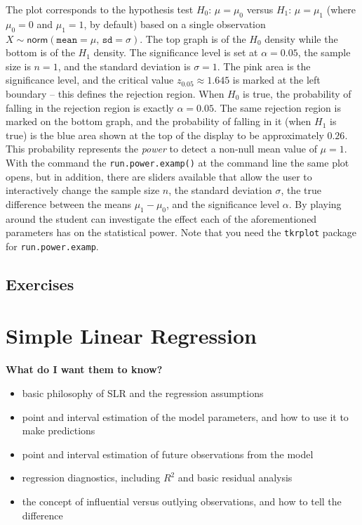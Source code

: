 \documentclass[]{book}
\providecommand{\tightlist}{%
  \setlength{\itemsep}{0pt}\setlength{\parskip}{0pt}}
\numberwithin{equation}{chapter}
\numberwithin{figure}{chapter}
\theoremstyle{plain}
\theoremstyle{definition}
\theoremstyle{remark}
\theoremstyle{definition}
\theoremstyle{definition}
\theoremstyle{remark}
\begin{document}
The plot corresponds to the hypothesis test \(H_{0}:\,\mu=\mu_{0}\)
versus \(H_{1}:\,\mu=\mu_{1}\) (where \(\mu_{0}=0\) and \(\mu_{1}=1\),
by default) based on a single observation
\(X\sim\mathsf{norm}(\mathtt{mean}=\mu,\,\mathtt{sd}=\sigma)\). The top
graph is of the \(H_{0}\) density while the bottom is of the \(H_{1}\)
density. The significance level is set at \(\alpha=0.05\), the sample
size is \(n=1\), and the standard deviation is \(\sigma=1\). The pink
area is the significance level, and the critical value
\(z_{0.05}\approx1.645\) is marked at the left boundary -- this defines
the rejection region. When \(H_{0}\) is true, the probability of falling
in the rejection region is exactly \(\alpha=0.05\). The same rejection
region is marked on the bottom graph, and the probability of falling in
it (when \(H_{1}\) is true) is the blue area shown at the top of the
display to be approximately \(0.26\). This probability represents the
\emph{power} to detect a non-null mean value of \(\mu=1\). With the
command the \texttt{run.power.examp()} at the command line the same plot
opens, but in addition, there are sliders available that allow the user
to interactively change the sample size \(n\), the standard deviation
\(\sigma\), the true difference between the means \(\mu_{1}-\mu_{0}\),
and the significance level \(\alpha\). By playing around the student can
investigate the effect each of the aforementioned parameters has on the
statistical power. Note that you need the \texttt{tkrplot} package
\autocite{tkrplot} for \texttt{run.power.examp}.

\section{Exercises}\label{exercises-8}

\chapter{Simple Linear Regression}\label{cha-simple-linear-regression}

\textbf{What do I want them to know?}

\begin{itemize}
\tightlist
\item
  basic philosophy of SLR and the regression assumptions
\item
  point and interval estimation of the model parameters, and how to use
  it to make predictions
\item
  point and interval estimation of future observations from the model
\item
  regression diagnostics, including \(R^{2}\) and basic residual
  analysis
\item
  the concept of influential versus outlying observations, and how to
  tell the difference
\end{itemize}
\end{document}
